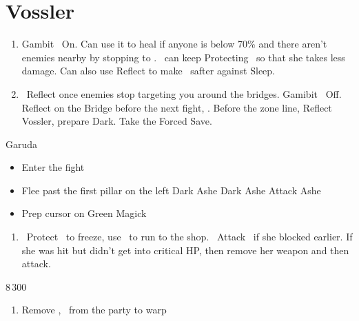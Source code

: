 \chapter{Vossler}

\begin{enumerate}
	\item Gambit \ashe\ On. Can use it to heal if anyone is below 70\% and there aren't enemies nearby by stopping to \flee. \vaan\ can keep Protecting \penelo\ so that she takes less damage. Can also use Reflect to make \penelo\ safter against Sleep.
	\item \vaan\ Reflect \vaan once enemies stop targeting you around the bridges. Gamibit \ashe\ Off. Reflect on the Bridge before the next fight, \leader{\penelo}. Before the zone line, Reflect Vossler, prepare Dark. Take the Forced Save.
\end{enumerate}
\begin{battle}{Garuda}
	\begin{itemize}
		\penelof Dark \ashe, ensure that it lands
		\ashef Attack \penelo
		\penelof If not in critical, then Attack \penelo
		\item Enter the fight
		\item Flee past the first pillar on the left
		      \penelof Dark Ashe
		      \vaanf Dark Ashe
		      \ashef Attack Ashe
		\item Prep cursor on Green Magick
	\end{itemize}
\end{battle}
\begin{enumerate}
	\item \vaan\ Protect \vaan\ to freeze, use \penelo\ to run to the shop. \ashe\ Attack \ashe\ if she blocked earlier. If she was hit but didn't get into critical HP, then remove her weapon and then attack.
\end{enumerate}
\begin{shop}{8\,300}
\end{shop}
\begin{enumerate}
	\item Remove \ashe, \penelo\ from the party to warp
\end{enumerate}
\begin{liscense}
	\begin{itemize}
		\ashef
		\begin{itemize}
		\end{itemize}
	\end{itemize}
\end{liscense}
